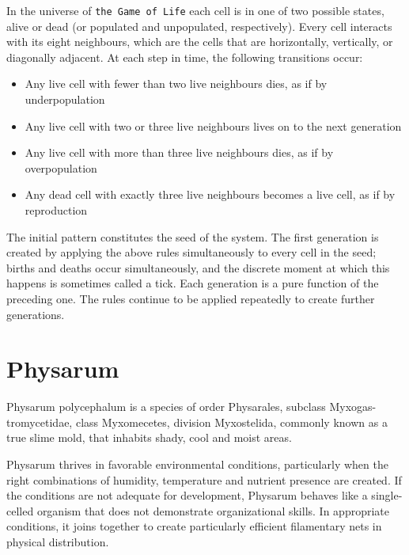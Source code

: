 \par
In the universe of \texttt{the Game of Life} each cell is in one of two possible states, alive or dead (or populated and unpopulated, respectively). Every cell interacts with its eight neighbours, which are the cells that are horizontally, vertically, or diagonally adjacent. At each step in time, the following transitions occur:
\begin{itemize}
\item Any live cell with fewer than two live neighbours dies, as if by underpopulation
\item Any live cell with two or three live neighbours lives on to the next generation
\item Any live cell with more than three live neighbours dies, as if by overpopulation
\item Any dead cell with exactly three live neighbours becomes a live cell, as if by reproduction
\end{itemize}
\par
The initial pattern constitutes the seed of the system. The first generation is created by applying the above rules simultaneously to every cell in the seed; births and deaths occur simultaneously, and the discrete moment at which this happens is sometimes called a tick. Each generation is a pure function of the preceding one. The rules continue to be applied repeatedly to create further generations. 

\section{Physarum}

Physarum polycephalum\cite{Tsompanas2016} is a species of order Physarales, subclass Myxogas-tromycetidae, class Myxomecetes, division Myxostelida, commonly known as a true slime mold, that inhabits shady, cool and moist areas. 
\par
Physarum thrives in favorable environmental conditions, particularly when the right combinations of humidity, temperature and nutrient presence are created. If the conditions are not adequate for development, Physarum behaves like a single-celled organism that does not demonstrate organizational skills. In appropriate conditions, it joins together to create particularly efficient filamentary nets in physical distribution.
